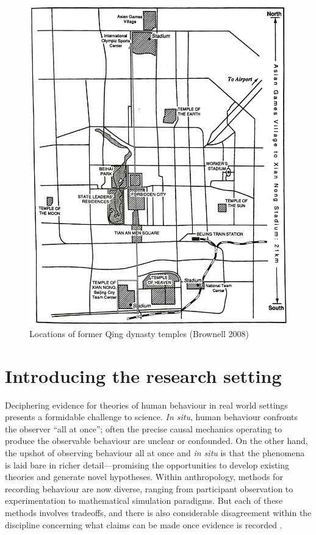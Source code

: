 \begin{CJK}{UTF8}{gbsn}
\begin{figure}[htbp]
  \includegraphics[width = \linewidth]{images/beijingTemplesXNT.png}
  \caption{Locations of former Qing dynasty temples (Brownell 2008)}
  \label{fig:beijingTemplesXNT}
\end{figure}




\section{Introducing the research setting}

Deciphering evidence for theories of human behaviour in real world settings presents a formidable challenge to science.  \textit{In situ}, human behaviour confronts the observer ``all at once''; often the precise causal mechanics operating to produce the observable behaviour are unclear or confounded.  On the other hand, the upshot of observing behaviour all at once and \textit{in situ} is that the phenomena is laid bare in richer detail---promising the opportunities to develop existing theories and generate novel hypotheses.  Within anthropology, methods for recording behaviour are now diverse, ranging from participant observation to experimentation to mathematical simulation paradigms.   But each of these methods involves tradeoffs, and there is also considerable disagreement within the discipline concerning what claims can be made once evidence is recorded \citep{Whitehouse2012}.


\end{CJK}

